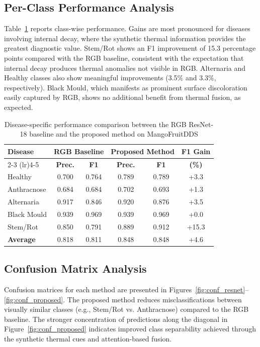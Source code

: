 \documentclass[utf8]{FrontiersinHarvard} %
\begin{document}
\subsection{Per-Class Performance Analysis}
Table~\ref{tab:perclass} reports class-wise performance. Gains are most pronounced for diseases involving internal decay, where the synthetic thermal information provides the greatest diagnostic value. Stem/Rot shows an F1 improvement of 15.3 percentage points compared with the RGB baseline, consistent with the expectation that internal decay produces thermal anomalies not visible in RGB. Alternaria and Healthy classes also show meaningful improvements (3.5\% and 3.3\%, respectively). Black Mould, which manifests as prominent surface discoloration easily captured by RGB, shows no additional benefit from thermal fusion, as expected.

\begin{table}[h!]
    \caption{Disease-specific performance comparison between the RGB ResNet-18 baseline and the proposed method on MangoFruitDDS}
    \label{tab:perclass}
    \raggedright
    \scriptsize
    \begin{tabular}{lccccc}
        \toprule
        \multirow{2}{*}{\textbf{Disease}} & \multicolumn{2}{c}{\textbf{RGB Baseline}} & \multicolumn{2}{c}{\textbf{Proposed Method}} & \textbf{F1 Gain} \\
        \cmidrule(lr){2-3} \cmidrule(lr){4-5}
         & \textbf{Prec.} & \textbf{F1} & \textbf{Prec.} & \textbf{F1} & \textbf{(\%)} \\
        \midrule
        Healthy & 0.700 & 0.764 & 0.789 & 0.789 & +3.3 \\
        Anthracnose & 0.684 & 0.684 & 0.702 & 0.693 & +1.3 \\
        Alternaria & 0.917 & 0.846 & 0.920 & 0.876 & +3.5 \\
        Black Mould & 0.939 & 0.969 & 0.939 & 0.969 & +0.0 \\
        Stem/Rot & 0.850 & 0.791 & 0.889 & 0.912 & +15.3 \\
        \midrule
        \textbf{Average} & 0.818 & 0.811 & 0.848 & 0.848 & +4.6 \\
        \bottomrule
    \end{tabular}
\end{table}

\subsection{Confusion Matrix Analysis}
Confusion matrices for each method are presented in Figures~\ref{fig:conf_resnet}--\ref{fig:conf_proposed}. The proposed method reduces misclassifications between visually similar classes (e.g., Stem/Rot vs. Anthracnose) compared to the RGB baseline. The stronger concentration of predictions along the diagonal in Figure~\ref{fig:conf_proposed} indicates improved class separability achieved through the synthetic thermal cues and attention-based fusion.
\end{document}
